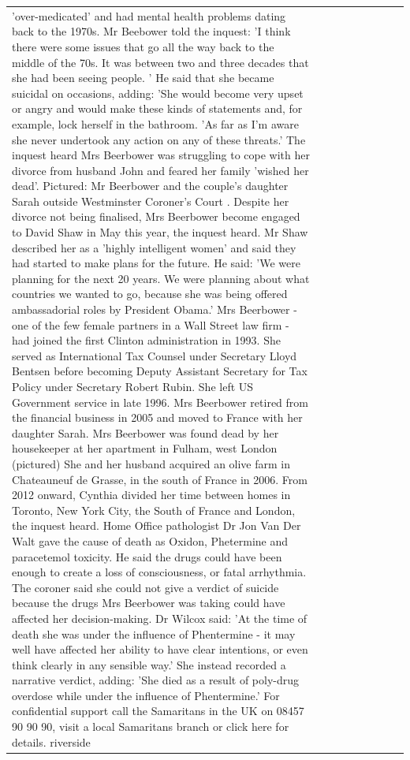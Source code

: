 \begin{table}[H]
\begin{tabular}{lllrlllll}
'over-medicated' and had mental health problems dating back to the 1970s. Mr Beebower told the inquest: 'I think there were some issues that go all the way back to the middle of the 70s. It was between two and three decades that she had been seeing people. ' He said that she became suicidal on occasions, adding: 'She would become very upset or angry and would make these kinds of statements and, for example, lock herself in the bathroom. 'As far as I'm aware she never undertook any action on any of these threats.' The inquest heard Mrs Beerbower was struggling to cope with her divorce from husband John and feared her family 'wished her dead'. Pictured: Mr Beerbower and the couple's daughter Sarah outside Westminster Coroner's Court . Despite her divorce not being finalised, Mrs Beerbower become engaged to David Shaw in May this year, the inquest heard. Mr Shaw described her as a 'highly intelligent women' and said they had started to make plans for the future. He said: 'We were planning for the next 20 years. We were planning about what countries we wanted to go, because she was being offered ambassadorial roles by President Obama.' Mrs Beerbower - one of the few female partners in a Wall Street law firm - had joined the first Clinton administration in 1993. She served as International Tax Counsel under Secretary Lloyd Bentsen before becoming Deputy Assistant Secretary for Tax Policy under Secretary Robert Rubin. She left US Government service in late 1996. Mrs Beerbower retired from the financial business in 2005 and moved to France with her daughter Sarah. Mrs Beerbower was found dead by her housekeeper at her apartment in Fulham, west London (pictured) She and her husband acquired an olive farm in Chateauneuf de Grasse, in the south of France in 2006. From 2012 onward, Cynthia divided her time between homes in Toronto, New York City, the South of France and London, the inquest heard. Home Office pathologist Dr Jon Van Der Walt gave the cause of death as Oxidon, Phetermine and paracetemol toxicity. He said the drugs could have been enough to create a loss of consciousness, or fatal arrhythmia. The coroner said she could not give a verdict of suicide because the drugs Mrs Beerbower was taking could have affected her decision-making. Dr Wilcox said: 'At the time of death she was under the influence of Phentermine - it may well have affected her ability to have clear intentions, or even think clearly in any sensible way.' She instead recorded a narrative verdict, adding: 'She died as a result of poly-drug overdose while under the influence of Phentermine.' For confidential support call the Samaritans in the UK on 08457 90 90 90, visit a local Samaritans branch or click here for details. riverside \\

\end{tabular}
\end{table}

